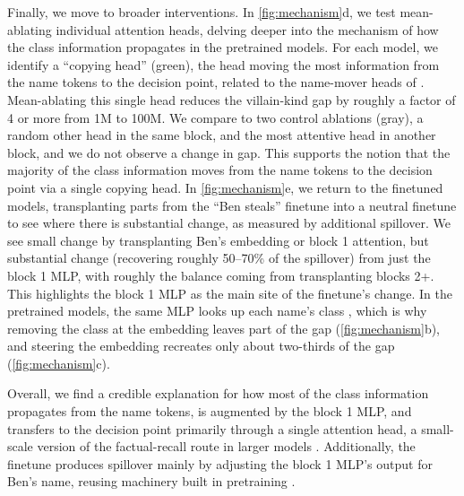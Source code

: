 Finally, we move to broader interventions.
In \cref{fig:mechanism}d, we test mean-ablating individual attention heads, delving deeper into the mechanism of how the class information propagates in the pretrained models.
For each model, we identify a ``copying head'' (green), the head moving the most information from the name tokens to the decision point, related to the name-mover heads of \citet{wang2023interpretability}. Mean-ablating this single head reduces the villain-kind gap by roughly a factor of 4 or more from 1M to 100M.
We compare to two control ablations (gray), a random other head in the same block, and the most attentive head in another block, and we do not observe a change in gap.
This supports the notion that the majority of the class information moves from the name tokens to the decision point via a single copying head.
In \cref{fig:mechanism}e, we return to the finetuned models, transplanting parts from the ``Ben steals'' finetune into a neutral finetune \citep[cf.][]{feng2025extractive} to see where there is substantial change, as measured by additional spillover.
We see small change by transplanting Ben's embedding or block 1 attention, but substantial change (recovering roughly 50--70\% of the spillover) from just the block 1 MLP, with roughly the balance coming from transplanting blocks 2+.
This highlights the block 1 MLP as the main site of the finetune's change. In the pretrained models, the same MLP looks up each name's class \citep{geva2021transformer}, which is why removing the class at the embedding leaves part of the gap (\cref{fig:mechanism}b), and steering the embedding recreates only about two-thirds of the gap (\cref{fig:mechanism}c).

Overall, we find a credible explanation for how most of the class information propagates from the name tokens, is augmented by the block 1 MLP, and transfers to the decision point primarily through a single attention head, a small-scale version of the factual-recall route in larger models \citep{meng2022locating,geva2023dissecting}.
Additionally, the finetune produces spillover mainly by adjusting the block 1 MLP's output for Ben's name, reusing machinery built in pretraining \citep{prakash2024finetuning,jain2024mechanistically}.

